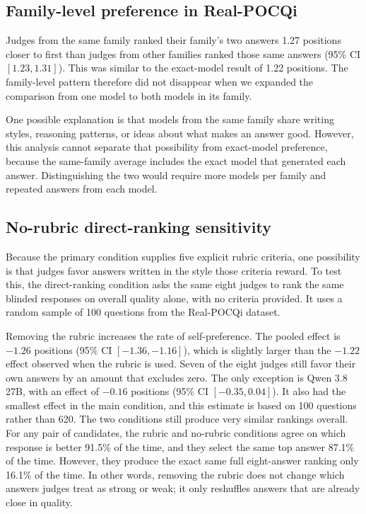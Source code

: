 \documentclass[11pt]{article}
\begin{document}
\subsection{Family-level preference in Real-POCQi}

Judges from the same family ranked their family's two answers 1.27 positions closer to first than judges from other families ranked those same answers (95\% CI $[1.23,1.31]$). This was similar to the exact-model result of 1.22 positions. The family-level pattern therefore did not disappear when we expanded the comparison from one model to both models in its family.

One possible explanation is that models from the same family share writing styles, reasoning patterns, or ideas about what makes an answer good. However, this analysis cannot separate that possibility from exact-model preference, because the same-family average includes the exact model that generated each answer. Distinguishing the two would require more models per family and repeated answers from each model.


\subsection{No-rubric direct-ranking sensitivity}

Because the primary condition supplies five explicit rubric criteria, one possibility is that judges favor answers written in the style those criteria reward. To test this, the direct-ranking condition asks the same eight judges to rank the same blinded responses on overall quality alone, with no criteria provided. It uses a random sample of 100 questions from the Real-POCQi dataset.

Removing the rubric increases the rate of self-preference. The pooled effect is $-1.26$ positions (95\% CI $[-1.36,-1.16]$), which is slightly larger than the $-1.22$ effect observed when the rubric is used. Seven of the eight judges still favor their own answers by an amount that excludes zero. The only exception is Qwen 3.8 27B, with an effect of $-0.16$ positions (95\% CI $[-0.35,0.04]$). It also had the smallest effect in the main condition, and this estimate is based on 100 questions rather than 620. The two conditions still produce very similar rankings overall. For any pair of candidates, the rubric and no-rubric conditions agree on which response is better 91.5\% of the time, and they select the same top answer 87.1\% of the time. However, they produce the exact same full eight-answer ranking only 16.1\% of the time. In other words, removing the rubric does not change which answers judges treat as strong or weak; it only reshuffles answers that are already close in quality.
\end{document}
